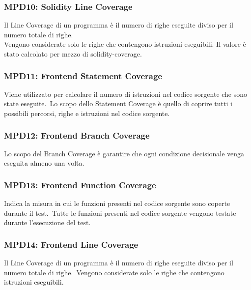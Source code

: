 \subsubsection{MPD10: Solidity Line Coverage}\label{sssec:solidity_line_coverage}
Il Line Coverage di un programma è il numero di righe eseguite diviso per il numero totale di righe.\\
Vengono considerate solo le righe che contengono istruzioni eseguibili.
Il valore è stato calcolato per mezzo di solidity-coverage.
\subsubsection{MPD11: Frontend Statement Coverage}\label{sssec:frontend_statement_coverage}
Viene utilizzato per calcolare il numero di istruzioni nel codice sorgente che sono state eseguite.\
Lo scopo dello Statement Coverage è quello di coprire tutti i possibili percorsi, righe e istruzioni nel codice sorgente.\


\subsubsection{MPD12: Frontend Branch Coverage}\label{sssec:frontend_branch_coverage}
Lo scopo del Branch Coverage è garantire che ogni condizione decisionale venga eseguita almeno una volta.\


\subsubsection{MPD13: Frontend Function Coverage}\label{sssec:frontend_function_coverage}
Indica la misura in cui le funzioni presenti nel codice sorgente sono coperte durante il test.\
Tutte le funzioni presenti nel codice sorgente vengono testate durante l'esecuzione del test.\


\subsubsection{MPD14: Frontend Line Coverage}\label{sssec:frontend_line_coverage}
Il Line Coverage di un programma è il numero di righe eseguite diviso per il numero totale di righe.\
Vengono considerate solo le righe che contengono istruzioni eseguibili.

